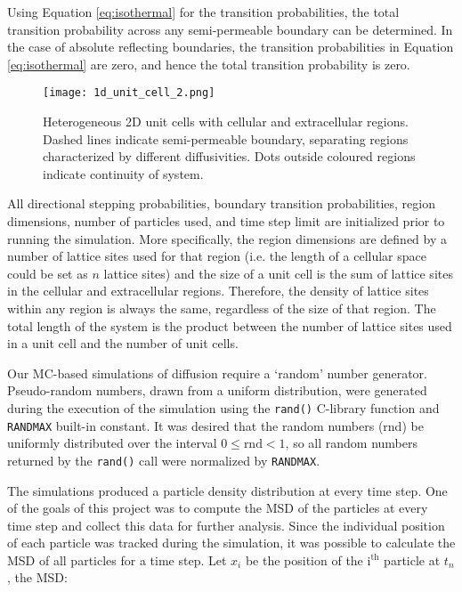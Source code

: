 	Using Equation \ref{eq:isothermal} for the transition probabilities, the total transition probability across any semi-permeable boundary can be determined. In the case of absolute reflecting boundaries, the transition probabilities in Equation \ref{eq:isothermal} are zero, and hence the total transition probability is zero.
	
	\begin{figure}[h]
		\centering
		\texttt{[image: 1d\_unit\_cell\_2.png]}
		\caption{Heterogeneous 2D unit cells with cellular and extracellular regions. Dashed lines indicate semi-permeable boundary, separating regions characterized by different diffusivities. Dots outside coloured regions indicate continuity of system.}
		\label{fig:1d_unit_cell_2.png}
	\end{figure}
	
	\newpage
	All directional stepping probabilities, boundary transition probabilities, region dimensions, number of particles used, and time step limit are initialized prior to running the simulation. More specifically, the region dimensions are defined by a number of lattice sites used for that region (i.e. the length of a cellular space could be set as $ n $ lattice sites) and the size of a unit cell is the sum of lattice sites in the cellular and extracellular regions. Therefore, the density of lattice sites within any region is always the same, regardless of the size of that region. The total length of the system is the product between the number of lattice sites used in a unit cell and the number of unit cells.
	 	
	Our MC-based simulations of diffusion require a `random' number generator. Pseudo-random numbers, drawn from a uniform distribution, were generated during the execution of the simulation using the \texttt{rand()} C-library function and \texttt{RAND\textunderscore MAX} built-in constant. It was desired that the random numbers (rnd) be uniformly distributed over the interval $ 0 \leq \textrm{rnd} < 1 $, so all random numbers returned by the \texttt{rand()} call were normalized by \texttt{RAND\textunderscore MAX}.
	
	The simulations produced a particle density distribution at every time step. One of the goals of this project was to compute the MSD of the particles at every time step and collect this data for further analysis. Since the individual position of each particle was tracked during the simulation, it was possible to calculate the MSD of all particles for a time step. Let $ x_i $ be the position of the $ \textrm{i}^\textrm{th} $ particle at $ t_n $, the MSD:
	

